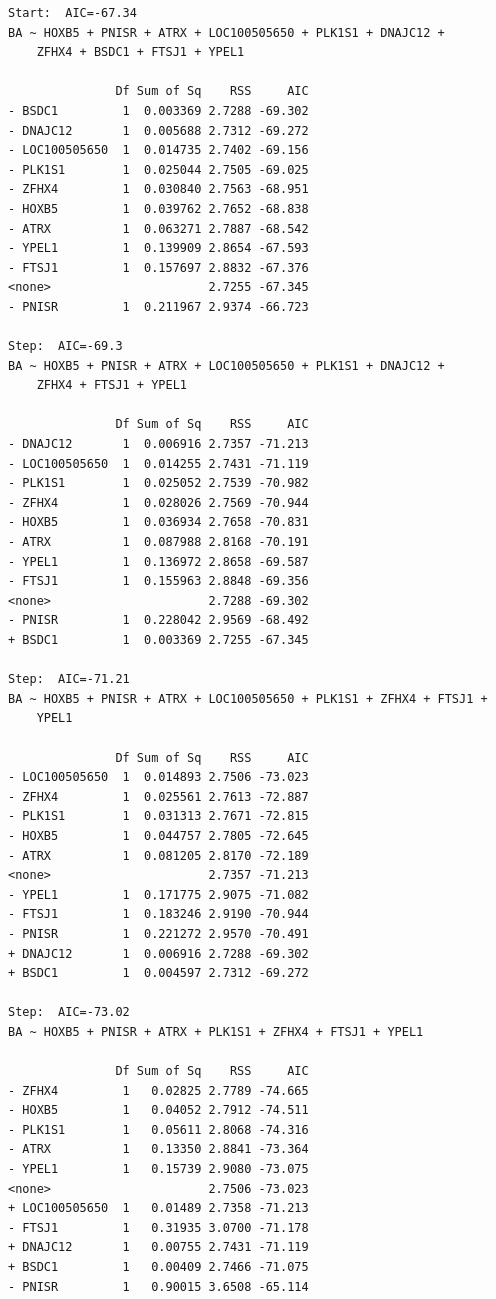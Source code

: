 \documentclass[
  dutch,
  letterpaper,
  12pt]{book}
\newcounter{none} %
\theoremstyle{definition}
\theoremstyle{definition}
\theoremstyle{definition}
\theoremstyle{remark}
\begin{document}
\begin{verbatim}
Start:  AIC=-67.34
BA ~ HOXB5 + PNISR + ATRX + LOC100505650 + PLK1S1 + DNAJC12 + 
    ZFHX4 + BSDC1 + FTSJ1 + YPEL1

               Df Sum of Sq    RSS     AIC
- BSDC1         1  0.003369 2.7288 -69.302
- DNAJC12       1  0.005688 2.7312 -69.272
- LOC100505650  1  0.014735 2.7402 -69.156
- PLK1S1        1  0.025044 2.7505 -69.025
- ZFHX4         1  0.030840 2.7563 -68.951
- HOXB5         1  0.039762 2.7652 -68.838
- ATRX          1  0.063271 2.7887 -68.542
- YPEL1         1  0.139909 2.8654 -67.593
- FTSJ1         1  0.157697 2.8832 -67.376
<none>                      2.7255 -67.345
- PNISR         1  0.211967 2.9374 -66.723

Step:  AIC=-69.3
BA ~ HOXB5 + PNISR + ATRX + LOC100505650 + PLK1S1 + DNAJC12 + 
    ZFHX4 + FTSJ1 + YPEL1

               Df Sum of Sq    RSS     AIC
- DNAJC12       1  0.006916 2.7357 -71.213
- LOC100505650  1  0.014255 2.7431 -71.119
- PLK1S1        1  0.025052 2.7539 -70.982
- ZFHX4         1  0.028026 2.7569 -70.944
- HOXB5         1  0.036934 2.7658 -70.831
- ATRX          1  0.087988 2.8168 -70.191
- YPEL1         1  0.136972 2.8658 -69.587
- FTSJ1         1  0.155963 2.8848 -69.356
<none>                      2.7288 -69.302
- PNISR         1  0.228042 2.9569 -68.492
+ BSDC1         1  0.003369 2.7255 -67.345

Step:  AIC=-71.21
BA ~ HOXB5 + PNISR + ATRX + LOC100505650 + PLK1S1 + ZFHX4 + FTSJ1 + 
    YPEL1

               Df Sum of Sq    RSS     AIC
- LOC100505650  1  0.014893 2.7506 -73.023
- ZFHX4         1  0.025561 2.7613 -72.887
- PLK1S1        1  0.031313 2.7671 -72.815
- HOXB5         1  0.044757 2.7805 -72.645
- ATRX          1  0.081205 2.8170 -72.189
<none>                      2.7357 -71.213
- YPEL1         1  0.171775 2.9075 -71.082
- FTSJ1         1  0.183246 2.9190 -70.944
- PNISR         1  0.221272 2.9570 -70.491
+ DNAJC12       1  0.006916 2.7288 -69.302
+ BSDC1         1  0.004597 2.7312 -69.272

Step:  AIC=-73.02
BA ~ HOXB5 + PNISR + ATRX + PLK1S1 + ZFHX4 + FTSJ1 + YPEL1

               Df Sum of Sq    RSS     AIC
- ZFHX4         1   0.02825 2.7789 -74.665
- HOXB5         1   0.04052 2.7912 -74.511
- PLK1S1        1   0.05611 2.8068 -74.316
- ATRX          1   0.13350 2.8841 -73.364
- YPEL1         1   0.15739 2.9080 -73.075
<none>                      2.7506 -73.023
+ LOC100505650  1   0.01489 2.7358 -71.213
- FTSJ1         1   0.31935 3.0700 -71.178
+ DNAJC12       1   0.00755 2.7431 -71.119
+ BSDC1         1   0.00409 2.7466 -71.075
- PNISR         1   0.90015 3.6508 -65.114


\end{verbatim}
\end{document}
